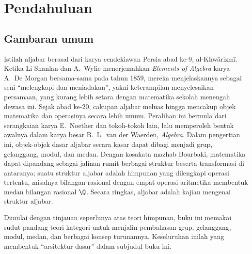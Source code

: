 
\chapter*{Pendahuluan}	%

\section*{Gambaran umum}
Istilah aljabar berasal dari karya cendekiawan Persia abad ke-9, al-Khwārizmī. Ketika Li Shanlan dan A.\ Wylie menerjemahkan \textit{Elements of Algebra} karya A.\ De Morgan bersama-sama pada tahun 1859, mereka menjelaskannya sebagai seni ``melengkapi dan meniadakan'', yakni keterampilan menyelesaikan persamaan, yang kurang lebih setara dengan matematika sekolah menengah dewasa ini. Sejak abad ke-20, cakupan aljabar meluas hingga mencakup objek matematika dan operasinya secara lebih umum. Peralihan ini bermula dari serangkaian karya E.\ Noether dan tokoh-tokoh lain, lalu memperoleh bentuk awalnya dalam karya besar B.\ L.\ van der Waerden, \textit{Algebra}\cite{vdW1, vdW2}. Dalam pengertian ini, objek-objek dasar aljabar secara kasar dapat dibagi menjadi grup, gelanggang, modul, dan medan. Dengan kosakata mazhab Bourbaki, matematika dapat dipandang sebagai jalinan rumit berbagai struktur beserta transformasi di antaranya; suatu struktur aljabar adalah himpunan yang dilengkapi operasi tertentu, misalnya bilangan rasional dengan empat operasi aritmetika membentuk medan bilangan rasional $\Q$. Secara ringkas, aljabar adalah kajian mengenai struktur aljabar.

Dimulai dengan tinjauan seperlunya atas teori himpunan, buku ini memakai sudut pandang teori kategori untuk menjalin pembahasan grup, gelanggang, modul, medan, dan berbagai konsep turunannya. Keseluruhan inilah yang membentuk ``arsitektur dasar'' dalam subjudul buku ini.


